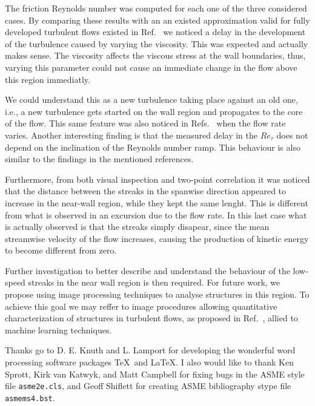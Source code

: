 \documentclass[twocolumn,10pt]{asme2e}
\begin{document}
The friction Reynolds number was computed for each one of the three considered cases. By comparing these results with an an existed approximation valid for fully developed turbulent flows existed in Ref.~\cite{pope} we noticed a delay in the development of the turbulence caused by varying the viscosity. This was expected and actually makes sense. The viscosity affects the viscous stress at the wall boundaries, thus, varying this parameter could not cause an immediate change in the flow above this region immediatly.

We could understand this as a new turbulence taking place against an old one, i.e., a new turbulence gets started on the wall region and propagates to the core of the flow. This same feature was also noticed in Refs.~\cite{maruyama1976,he2000,greenblatt2004,he2015} when the flow rate varies. Another interesting finding is that the measured delay in the \(Re_{\tau}\) does not depend on the inclination of the Reynolds number ramp. This behaviour is also similar to the findings in the mentioned references.

Furthermore, from both visual inspection and two-point correlation it was noticed that the distance between the streaks in the spanwise direction appeared to increase in the near-wall region, while they kept the same lenght. This is different from what is observed in an excursion due to the flow rate. In this last case what is actually observed is that the streaks simply disapear, since the mean streamwise velocity of the flow increases, causing the production of kinetic energy to become different from zero.

Further investigation to better describe and understand the behaviour of the low-speed streaks in the near wall region is then required. For future work, we propose using image processing techniques to analyse structures in this region. To achieve this goal we may reffer to image procedures allowing quantitative characterization of structures in turbulent flows, as proposed in Ref.~\cite{lin2008}, allied to machine learning techniques.

\begin{acknowledgment}
Thanks go to D. E. Knuth and L. Lamport for developing the wonderful word processing software packages \TeX\ and \LaTeX. I also would like to thank Ken Sprott, Kirk van Katwyk, and Matt Campbell for fixing bugs in the ASME style file \verb+asme2e.cls+, and Geoff Shiflett for creating 
ASME bibliography stype file \verb+asmems4.bst+.
\end{acknowledgment}




\appendix   
\end{document}
